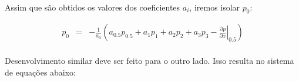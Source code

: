 \documentclass[introducao.tex]{subfiles}
\begin{document}
\paragraph{} Assim que são obtidos os valores dos coeficientes $a_i$, iremos isolar $p_0$:

\begin{eqnarray}
p_0 & = & -\frac{1}{a_0}\left(a_{0.5}p_{0.5} + a_1 p_1 + a_2 p_2 + a_3 p_3 - \left.\frac{\partial p}{\partial x}\right|_{0.5}\right)
\end{eqnarray}

\paragraph{} Desenvolvimento similar deve ser feito para o outro lado. Isso resulta no sistema de equações abaixo:

\nonsymmetricleft

%
\end{document}
